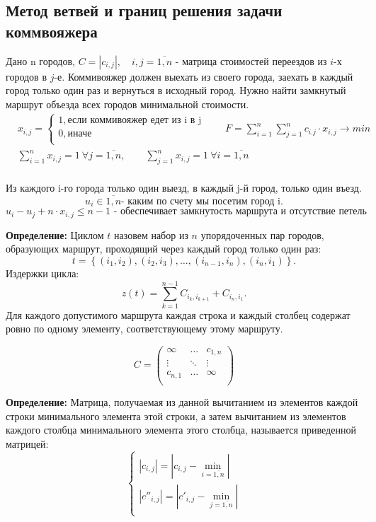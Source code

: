 \documentclass[17pt]{extarticle}
\begin{document}
\subsection*{Метод ветвей и границ решения задачи коммвояжера}
Дано n городов, $C = \left| c_{i,j} \right|, \quad i, j = \overline{1, n}$ - матрица стоимостей переездов из $i$-х городов в $j$-е.
Коммивояжер должен выехать из своего города, заехать в каждый город только один раз и вернуться в исходный город. Нужно найти замкнутый маршрут объезда всех городов минимальной стоимости.
\[
    \begin{aligned}
         & x_{i,j} = \begin{cases} 1, \text{если коммивояжер едет из i в j} \\ 0, \text{иначе} \\ \end{cases}
        \qquad F=\sum_{i=1}^n \sum_{j=1}^n c_{i.j} \cdot x_{i,j} \rightarrow min                              \\
         & \sum_{i=1}^n x_{i,j} = 1 \ \forall j=\overline{1,n}, \qquad
        \sum_{j=1}^n x_{i,j} = 1 \ \forall i=\overline{1,n}                                                   \\
    \end{aligned}
\]

Из каждого i-го города только один выезд, в каждый j-й город, только один въезд.
\[u_i \in \overline{1,n} \text{- каким по счету мы посетим город i.}\]
\[u_i-u_j + n \cdot x_{i,j} \leq n - 1 \text{ - обеспечивает замкнутость маршрута и отсутствие петель}\]

\textbf{Определение:} Циклом \( t \) назовем набор из \( n \) упорядоченных пар городов, образующих маршрут, проходящий через каждый город только один раз:
\[
    t = \left\{(i_1, i_2), (i_2, i_3), \dots, (i_{n-1}, i_n), (i_n, i_1)\right\}.
\]
Издержки цикла:
\[
    z(t) = \sum_{k=1}^{n-1} C_{i_k, i_{k+1}} + C_{i_n, i_1}.
\]
Для каждого допустимого маршрута каждая строка и каждый столбец содержат ровно по одному элементу, соответствующему этому маршруту.

\[
    C = \begin{pmatrix}
        \infty  & \dots  & c_{1,n} \\
        \vdots  & \ddots & \vdots  \\
        c_{n,1} & \dots  & \infty  \\
    \end{pmatrix}
\]

\textbf{Определение:} Матрица, получаемая из данной вычитанием из элементов каждой строки минимального элемента этой строки, а затем вычитанием из элементов каждого столбца минимального элемента этого столбца, называется приведенной матрицей:
\[
    \begin{cases}
        \left|c_{i,j}\right| = \left| c_{i,j} - \mathop{\min{c_{i,j}}} \limits_{i=\overline{1,n}} \right|     \\
        \left|c''_{i,j}\right| = \left| c'_{i,j} - \mathop{\min{c'_{i,j}}} \limits_{j=\overline{1,n}} \right| \\
    \end{cases}
\]
\end{document}

